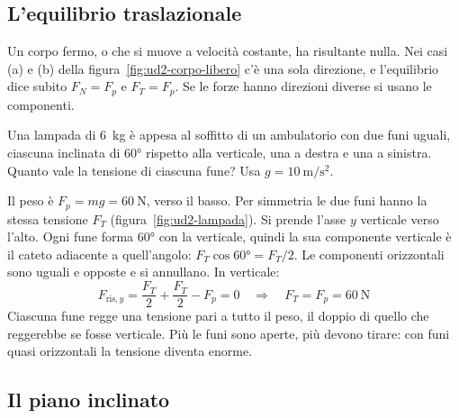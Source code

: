 \subsection{L'equilibrio traslazionale}

Un corpo fermo, o che si muove a velocità costante, ha risultante nulla. Nei casi (a) e (b) della figura~\ref{fig:ud2-corpo-libero} c'è una sola direzione, e l'equilibrio dice subito $F_N = F_p$ e $F_T = F_p$. Se le forze hanno direzioni diverse si usano le componenti.

\begin{esempio}
Una lampada di \SI{6}{\kilo\gram} è appesa al soffitto di un ambulatorio con due funi uguali, ciascuna inclinata di \ang{60} rispetto alla verticale, una a destra e una a sinistra. Quanto vale la tensione di ciascuna fune? Usa $g = \SI{10}{\metre\per\second\squared}$.

\par\medskip
\noindent\begin{minipage}{\linewidth}
\centering

\label{fig:ud2-lampada}
\end{minipage}
\medskip

Il peso è $F_p = mg = \SI{60}{\newton}$, verso il basso. Per simmetria le due funi hanno la stessa tensione $F_T$ (figura~\ref{fig:ud2-lampada}). Si prende l'asse $y$ verticale verso l'alto. Ogni fune forma \ang{60} con la verticale, quindi la sua componente verticale è il cateto adiacente a quell'angolo: $F_T\cos\ang{60} = F_T/2$. Le componenti orizzontali sono uguali e opposte e si annullano. In verticale:
\[
  F_{\text{ris},y} = \frac{F_T}{2} + \frac{F_T}{2} - F_p = 0
  \quad\Longrightarrow\quad
  F_T = F_p = \SI{60}{\newton}
\]
Ciascuna fune regge una tensione pari a tutto il peso, il doppio di quello che reggerebbe se fosse verticale. Più le funi sono aperte, più devono tirare: con funi quasi orizzontali la tensione diventa enorme.
\end{esempio}

\subsection{Il piano inclinato}

